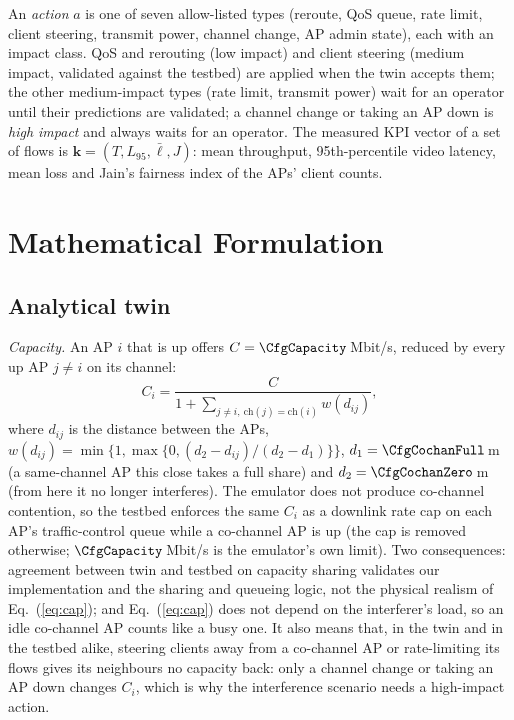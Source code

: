 \documentclass[conference]{IEEEtran}
\newcommand{\KPI}{\mathbf{k}}
\begin{document}
An \emph{action} $a$ is one of seven allow-listed types (reroute, QoS queue, rate limit, client steering, transmit power, channel change, AP admin state), each with an impact class. QoS and rerouting (low impact) and client steering (medium impact, validated against the testbed) are applied when the twin accepts them; the other medium-impact types (rate limit, transmit power) wait for an operator until their predictions are validated; a channel change or taking an AP down is \emph{high impact} and always waits for an operator. The measured KPI vector of a set of flows is $\KPI=(T,L_{95},\bar\ell,J)$: mean throughput, 95th-percentile video latency, mean loss and Jain's fairness index \cite{jain1984} of the APs' client counts.

\section{Mathematical Formulation}
\subsection{Analytical twin}
\emph{Capacity.} An AP $i$ that is up offers $C=\CfgCapacity$\,Mbit/s, reduced by every up AP $j\neq i$ on its channel:
\begin{equation}
C_i=\frac{C}{1+\sum_{j\neq i,\ \mathrm{ch}(j)=\mathrm{ch}(i)} w(d_{ij})},
\label{eq:cap}
\end{equation}
where $d_{ij}$ is the distance between the APs, $w(d_{ij})=\min\{1,\max\{0,(d_2-d_{ij})/(d_2-d_1)\}\}$, $d_1=\CfgCochanFull$\,m (a same-channel AP this close takes a full share) and $d_2=\CfgCochanZero$\,m (from here it no longer interferes). The emulator does not produce co-channel contention, so the testbed enforces the same $C_i$ as a downlink rate cap on each AP's traffic-control queue while a co-channel AP is up (the cap is removed otherwise; $\CfgCapacity$\,Mbit/s is the emulator's own limit). Two consequences: agreement between twin and testbed on capacity sharing validates our implementation and the sharing and queueing logic, not the physical realism of Eq.~(\ref{eq:cap}); and Eq.~(\ref{eq:cap}) does not depend on the interferer's load, so an idle co-channel AP counts like a busy one. It also means that, in the twin and in the testbed alike, steering clients away from a co-channel AP or rate-limiting its flows gives its neighbours no capacity back: only a channel change or taking an AP down changes $C_i$, which is why the interference scenario needs a high-impact action.
\end{document}
